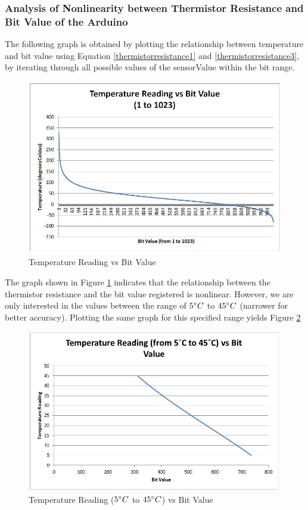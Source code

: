 \subsubsection{Analysis of Nonlinearity between Thermistor Resistance and Bit Value of the Arduino}

The following graph is obtained by plotting the relationship between temperature and bit value using Equation \ref{thermistorresistance1} and \ref{thermistorresistance3}, by iterating through all possible values of the sensorValue within the bit range.

\begin{figure}[H]
	\centering
	\includegraphics[width=\linewidth]{thermistor2.jpg}
	\caption{Temperature Reading vs Bit Value}
	\label{temperaturevsbitvalue}
\end{figure}

The graph shown in Figure \ref{temperaturevsbitvalue} indicates that the relationship between the thermistor resistance and the bit value registered is nonlinear. However, we are only interested in the values between the range of $5\degree C$ to $45\degree C$ (narrower for better accuracy). Plotting the same graph for this specified range yields Figure \ref{temperaturevsbitvalue5-45} 

\begin{figure}[H]
	\centering
	\includegraphics[width=\linewidth]{thermistor3.jpg}
	\caption{Temperature Reading ($5\degree C$ to $45\degree C$) vs Bit Value}
	\label{temperaturevsbitvalue5-45}
\end{figure}

